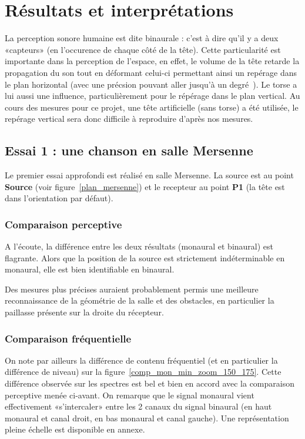 \chapter{Résultats et interprétations}

La perception sonore humaine est dite binaurale : c'est à dire qu'il y a deux «capteurs» (en l'occurence de chaque côté
de la tête).
Cette particularité est importante dans la perception de l'espace, en effet, le volume de la tête retarde la propagation
du son tout en déformant celui-ci permettant ainsi un repérage dans le plan horizontal (avec une précsion pouvant aller
jusqu'à un degré~\cite{Vor08}). Le torse a lui aussi une influence, particulièrement pour le répérage dans le plan
vertical. Au cours des mesures pour ce projet, une tête artificielle (sans torse) a été utilisée, le repérage vertical
sera donc difficile à reproduire d'après nos mesures.

\section{Essai 1 : une chanson en salle Mersenne} %

Le premier essai approfondi est réalisé en salle Mersenne. La source est au point \textbf{Source} (voir
figure~\ref{plan_mersenne}) et le recepteur au point \textbf{P1} (la tête est dans l'orientation par défaut).

\subsection{Comparaison perceptive} %

A l'écoute, la différence entre les deux résultats (monaural et binaural) est flagrante. Alors que la position de la
source est strictement indéterminable en monaural, elle est bien identifiable en binaural.

Des mesures plus précises auraient probablement permis une meilleure reconnaissance de la géométrie de la salle et des
obstacles, en particulier la paillasse présente sur la droite du récepteur.

\subsection{Comparaison fréquentielle} %

On note par ailleurs la différence de contenu fréquentiel (et en particulier la différence de niveau) sur la
figure~\ref{comp_mon_min_zoom_150_175}. Cette différence observée sur les spectres est bel et bien en accord avec la
comparaison perceptive menée ci-avant.
 On remarque que le signal monaural vient effectivement «s'intercaler» entre les
	2 canaux du signal binaural (en haut monaural et canal droit, en bas monaural et canal gauche). Une représentation
pleine échelle est disponible en annexe.


